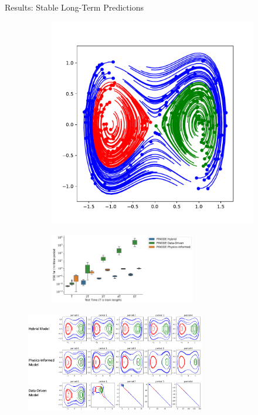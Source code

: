 \documentclass[8pt]{beamer}
\begin{document}
\begin{frame}{Results: Stable Long-Term Predictions}
\begin{figure}
	\begin{subfigure}[b]{0.3\textwidth}
		\includegraphics[width=\textwidth]{Figures/duff_full_train.pdf}
	\end{subfigure}%
	\begin{subfigure}[b]{0.7\textwidth}
		\centering
		\includegraphics[width=0.7\textwidth]{Figures/duffing_periods.pdf}
	\end{subfigure}
\end{figure}
\begin{figure}
	\includegraphics[width=0.7\textwidth]{Figures/duffing_periods_examples.png}
\end{figure}
\end{frame}
\end{document}
